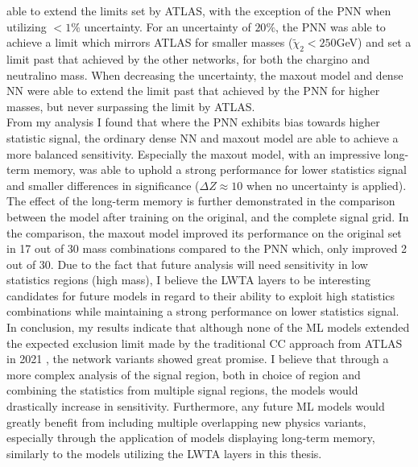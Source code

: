able to extend the limits set by \ac{ATLAS}, with the exception of the \ac{PNN} when utilizing $<1\%$ uncertainty. For an uncertainty of $20\%$, the \ac{PNN} was able to achieve a limit which mirrors \ac{ATLAS} for smaller masses ($\tilde{\chi}_2<250$GeV)
and set a limit past that achieved by the other networks, for both the chargino and neutralino mass. When decreasing the uncertainty, the maxout model and dense \ac{NN} were able to extend the limit past that achieved by the \ac{PNN} for higher masses, 
but never surpassing the limit by \ac{ATLAS}.
\\\newline
From my analysis I found that where the \ac{PNN} exhibits bias towards higher statistic signal, the ordinary dense \ac{NN} and maxout model are able to achieve a more balanced sensitivity. Especially the 
maxout model, with an impressive long-term memory, was able to uphold a strong performance for lower statistics signal and smaller differences in significance ($\Delta Z \approx 10$ when no uncertainty is applied). The effect of the long-term memory 
is further demonstrated in the comparison between the model after training on the original, and the complete signal grid. In the comparison, the maxout model improved its performance on the original set in 17 out of 30 mass combinations compared to the \ac{PNN} which, only improved
2 out of 30. Due to the fact that future analysis will need sensitivity in low statistics regions (high mass), I believe the \ac{LWTA} layers to be interesting candidates for future models in regard to their ability to exploit high statistics combinations while maintaining a 
strong performance on lower statistics signal. 
\\\newline
In conclusion, my results indicate that although none of the \ac{ML} models extended the expected exclusion limit made by the traditional \ac{CC} approach from \ac{ATLAS} in 2021 \cite{atlas_search_2021}, the network variants showed great promise. I believe
that through a more complex analysis of the signal region, both in choice of region and combining the statistics from multiple signal regions, the models would drastically increase in sensitivity. Furthermore, any future \ac{ML} models would greatly benefit from
including multiple overlapping new physics variants, especially through the application of models displaying long-term memory, similarly to the models utilizing the \ac{LWTA} layers in this thesis.
